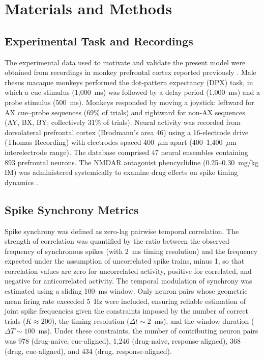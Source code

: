 \documentclass[10pt]{article}
\begin{document}
\section{Materials and Methods}

\subsection{Experimental Task and Recordings}

The experimental data used to motivate and validate the present model were obtained from recordings in monkey prefrontal cortex reported previously \citep{zick2018blocking}. Male rhesus macaque monkeys performed the dot-pattern expectancy (DPX) task, in which a cue stimulus (1,000~ms) was followed by a delay period (1,000~ms) and a probe stimulus (500~ms). Monkeys responded by moving a joystick: leftward for AX cue--probe sequences (69\% of trials) and rightward for non-AX sequences (AY, BX, BY; collectively 31\% of trials). Neural activity was recorded from dorsolateral prefrontal cortex (Brodmann's area 46) using a 16-electrode drive (Thomas Recording) with electrodes spaced 400~$\mu$m apart (400--1,400~$\mu$m interelectrode range). The database comprised 47 neural ensembles containing 893 prefrontal neurons. The NMDAR antagonist phencyclidine (0.25--0.30~mg/kg IM) was administered systemically to examine drug effects on spike timing dynamics \citep{zick2018blocking}.

\subsection{Spike Synchrony Metrics}

Spike synchrony was defined as zero-lag pairwise temporal correlation. The strength of correlation was quantified by the ratio between the observed frequency of synchronous spikes (with 2~ms timing resolution) and the frequency expected under the assumption of uncorrelated spike trains, minus 1, so that correlation values are zero for uncorrelated activity, positive for correlated, and negative for anticorrelated activity. The temporal modulation of synchrony was estimated using a sliding 100~ms window. Only neuron pairs whose geometric mean firing rate exceeded 5~Hz were included, ensuring reliable estimation of joint spike frequencies given the constraints imposed by the number of correct trials ($K \approx 200$), the timing resolution ($\Delta t \sim 2$~ms), and the window duration ($\Delta T \sim 100$~ms). Under these constraints, the number of contributing neuron pairs was 978 (drug-naive, cue-aligned), 1,246 (drug-naive, response-aligned), 368 (drug, cue-aligned), and 434 (drug, response-aligned).
\end{document}

